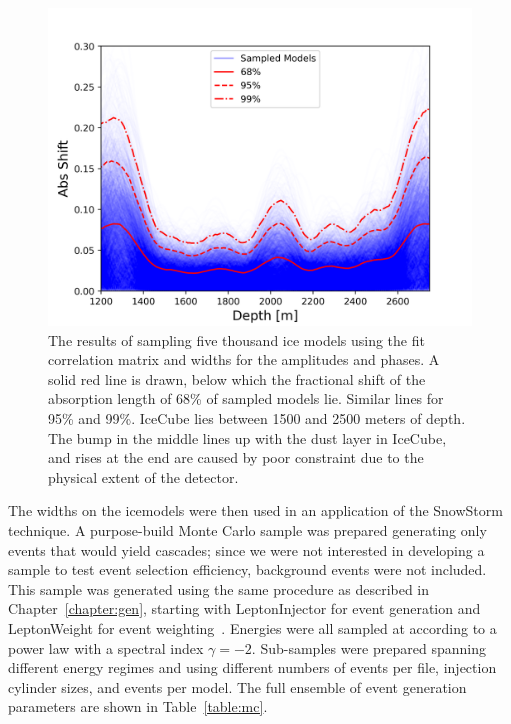 \documentclass[main.tex]{subfiles}
\begin{document}
\begin{figure}
    \centering
    \includegraphics[width=0.8\linewidth]{figures/icemodel_smooth.png}
    \caption{The results of sampling five thousand ice models using the fit correlation matrix and widths for the amplitudes and phases. A solid red line is drawn, below which the fractional shift of the absorption length of 68\% of sampled models lie. Similar lines for 95\% and 99\%. IceCube lies between 1500 and 2500 meters of depth. The bump in the middle lines up with the dust layer in IceCube, and rises at the end are caused by poor constraint due to the physical extent of the detector.}\label{fig:envelope}
\end{figure}

The widths on the icemodels were then used in an application of the SnowStorm technique. 
A purpose-build Monte Carlo sample was prepared generating only events that would yield cascades; since we were not interested in developing a sample to test event selection efficiency, background events were not included. 
This sample was generated using the same procedure as described in Chapter~\ref{chapter:gen}, starting with LeptonInjector for event generation and LeptonWeight for event weighting~\cite{ABBASI2021108018}. 
Energies were all sampled at according to a power law with a spectral index $\gamma=-2$.
Sub-samples were prepared spanning different energy regimes and using different numbers of events per file, injection cylinder sizes, and events per model. 
The full ensemble of event generation parameters are shown in Table~\ref{table:mc}.
\end{document}
